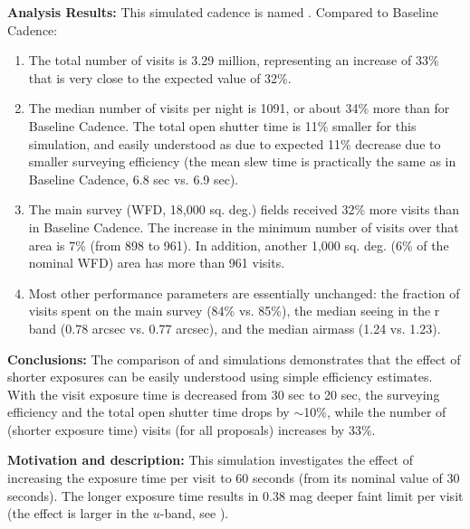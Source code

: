 {\bf Analysis Results:}  This simulated cadence is named
. Compared to Baseline Cadence:
\begin{enumerate}
\item The total number of visits is 3.29 million, representing an
increase of 33\% that is very close to the expected value of 32\%.
\item The median number of visits per night is 1091, or about 34\%
more than for Baseline Cadence. The total open shutter time is 11\%
smaller for this simulation, and easily understood as due to expected
11\% decrease due to smaller surveying efficiency (the mean slew time
is practically the same as in Baseline Cadence, 6.8 sec vs. 6.9 sec).
\item The main survey (WFD, 18,000 sq. deg.) fields received 32\% more
visits than in Baseline Cadence. The increase in the minimum number of
visits over that area is 7\% (from 898 to 961). In addition, another
1,000 sq. deg. (6\% of the nominal WFD) area has more than 961 visits.
\item Most other performance parameters are essentially unchanged: the
fraction of visits spent on the main survey (84\% vs. 85\%), the
median seeing in the r band (0.78 arcsec vs. 0.77 arcsec), and the
median airmass (1.24 vs. 1.23).
\end{enumerate}

{\bf Conclusions:}
The comparison of  and
 simulations demonstrates that the effect of
shorter exposures can be easily understood using simple efficiency
estimates. With the visit exposure time is decreased from 30 sec to 20
sec, the surveying efficiency and the total open shutter time drops by
$\sim$10\%, while the number of (shorter exposure time) visits (for
all proposals) increases by 33\%.





{\bf Motivation and description:} This simulation investigates the
effect of increasing the exposure time per visit to 60 seconds (from
its nominal value of 30 seconds). The longer exposure time results in
0.38 mag deeper faint limit per visit (the effect is larger in the
$u$-band, see ). \\

